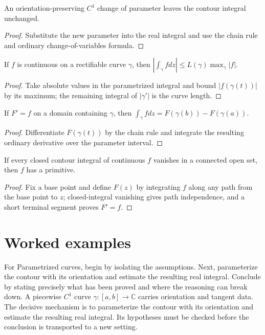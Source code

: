 \begin{theorem}\label{thm:iv04-01}
An orientation-preserving $C^1$ change of parameter leaves the contour integral unchanged.
\begin{proof}
Substitute the new parameter into the real integral and use the chain rule and ordinary change-of-variables formula.
\end{proof}
\end{theorem}

\begin{theorem}[ML inequality]\label{thm:iv04-02}
If $f$ is continuous on a rectifiable curve $\gamma$, then $|\int_\gamma fdz|\le L(\gamma)\max_\gamma|f|$.
\begin{proof}
Take absolute values in the parametrized integral and bound $|f(\gamma(t))|$ by its maximum; the remaining integral of $|\gamma'|$ is the curve length.
\end{proof}
\end{theorem}

\begin{theorem}\label{thm:iv04-03}
If $F'=f$ on a domain containing $\gamma$, then $\int_\gamma fdz=F(\gamma(b))-F(\gamma(a))$.
\begin{proof}
Differentiate $F(\gamma(t))$ by the chain rule and integrate the resulting ordinary derivative over the parameter interval.
\end{proof}
\end{theorem}

\begin{theorem}\label{thm:iv04-04}
If every closed contour integral of continuous $f$ vanishes in a connected open set, then $f$ has a primitive.
\begin{proof}
Fix a base point and define $F(z)$ by integrating $f$ along any path from the base point to $z$; closed-integral vanishing gives path independence, and a short terminal segment proves $F'=f$.
\end{proof}
\end{theorem}

\section{Worked examples}

\begin{example}\label{ex:iv04-worked-01}
For Parametrized curves, begin by isolating the assumptions. Next, parameterize the contour with its orientation and estimate the resulting real integral. Conclude by stating precisely what has been proved and where the reasoning can break down. A piecewise $C^1$ curve $\gamma:[a,b]\to\mathbb C$ carries orientation and tangent data. The decisive mechanism is to parameterize the contour with its orientation and estimate the resulting real integral. Its hypotheses must be checked before the conclusion is transported to a new setting.
\end{example}

